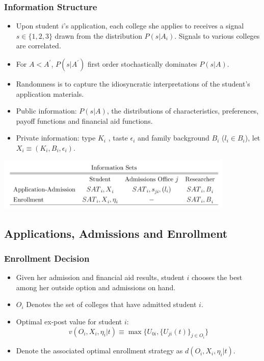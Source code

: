 \documentclass[10pt]{beamer}
\begin{document}
\begin{frame}[c]\frametitle{Information Structure}

\begin{itemize}
    \item Upon student $i$'s application, each college she applies to receives a signal $s\in\{1,2,3\}$ drawn from the distribution $P(s|A_{i})$. Signals to various colleges are correlated.
    \item For $A<A^{\prime}$, $P(s|A^{\prime})$ first order stochastically dominates $P(s|A)$.
    \item Randomness is to capture the idiosyncratic interpretations of the student's application materials.
    \item Public information: $P(s|A)$, the distributions of characteristics, preferences, payoff functions and financial aid functions.
    \item Private information:  type $K_{i}$ , taste $\epsilon_{i}$ and family
background $B_{i}$ ($l_{i}\in B_{i}$), let $X_{i}\equiv (K_{i},B_{i},\epsilon_{i})$.
\end{itemize}

\centerline{\includegraphics[width=0.85\textwidth]{info.png}}

\end{frame}

\subsection{Applications, Admissions and Enrollment}
\begin{frame}[c]\frametitle{Enrollment Decision}
\begin{itemize}
    \item Given her admission and financial aid results, student $i$ chooses the best among her outside option and admissions on hand.
    \item $O_{i}$ Denotes the set of colleges that have admitted student $i$.
    \item Optimal ex-post value for student $i$:
    \begin{equation}
        v(O_{i},X_{i},\eta_{i}|t) \equiv \max\{U_{0i},\{U_{ji}(t)\}_{j\in O_{i}}\}
    \end{equation}
    \item Denote the associated optimal enrollment strategy as $d(O_{i},X_{i},\eta_{i}|t)$.
\end{itemize}
\end{frame}
\end{document}
